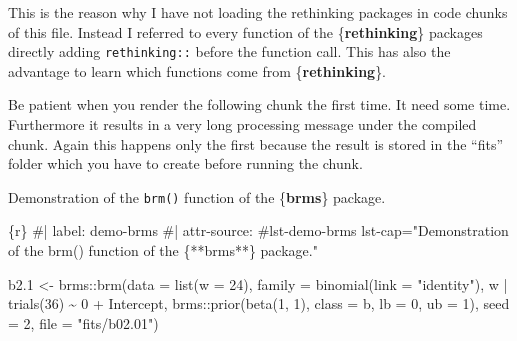 \documentclass[
  letterpaper,
  DIV=11,
  numbers=noendperiod]{scrreprt}
\newenvironment{Shaded}{\begin{snugshade}}{\end{snugshade}}
\newcommand{\AttributeTok}[1]{\textcolor[rgb]{0.40,0.45,0.13}{#1}}
\newcommand{\CommentTok}[1]{\textcolor[rgb]{0.37,0.37,0.37}{#1}}
\newcommand{\DecValTok}[1]{\textcolor[rgb]{0.68,0.00,0.00}{#1}}
\newcommand{\FloatTok}[1]{\textcolor[rgb]{0.68,0.00,0.00}{#1}}
\newcommand{\FunctionTok}[1]{\textcolor[rgb]{0.28,0.35,0.67}{#1}}
\newcommand{\InformationTok}[1]{\textcolor[rgb]{0.37,0.37,0.37}{#1}}
\newcommand{\NormalTok}[1]{\textcolor[rgb]{0.00,0.23,0.31}{#1}}
\newcommand{\OtherTok}[1]{\textcolor[rgb]{0.00,0.23,0.31}{#1}}
\newcommand{\SpecialCharTok}[1]{\textcolor[rgb]{0.37,0.37,0.37}{#1}}
\newcommand{\StringTok}[1]{\textcolor[rgb]{0.13,0.47,0.30}{#1}}
\begin{document}
This is the reason why I have not loading the rethinking packages in
code chunks of this file. Instead I referred to every function of the
\{\textbf{rethinking}\} packages directly adding \texttt{rethinking::}
before the function call. This has also the advantage to learn which
functions come from \{\textbf{rethinking}\}.

\begin{tcolorbox}[enhanced jigsaw, colframe=quarto-callout-warning-color-frame, colback=white, toprule=.15mm, breakable, arc=.35mm, bottomtitle=1mm, colbacktitle=quarto-callout-warning-color!10!white, toptitle=1mm, titlerule=0mm, title=\textcolor{quarto-callout-warning-color}{\faExclamationTriangle}\hspace{0.5em}{First compiling}, leftrule=.75mm, opacityback=0, rightrule=.15mm, opacitybacktitle=0.6, bottomrule=.15mm, left=2mm, coltitle=black]

Be patient when you render the following chunk the first time. It need
some time. Furthermore it results in a very long processing message
under the compiled chunk. Again this happens only the first because the
result is stored in the ``fits'' folder which you have to create before
running the chunk.

\end{tcolorbox}

\begin{codelisting}

\caption{Demonstration of the \texttt{brm()} function of the
\{\textbf{brms}\} package.}

\hypertarget{lst-demo-brms}{%
\label{lst-demo-brms}}%
\begin{Shaded}
\begin{Highlighting}[]
\InformationTok{\textasciigrave{}\textasciigrave{}\textasciigrave{}\{r\}}
\CommentTok{\#| label: demo{-}brms}
\CommentTok{\#| attr{-}source: \textquotesingle{}\#lst{-}demo{-}brms lst{-}cap="Demonstration of the \textasciigrave{}brm()\textasciigrave{} function of the \{**brms**\} package."\textquotesingle{}}

\NormalTok{b2}\FloatTok{.1} \OtherTok{\textless{}{-}}
\NormalTok{  brms}\SpecialCharTok{::}\FunctionTok{brm}\NormalTok{(}\AttributeTok{data =} \FunctionTok{list}\NormalTok{(}\AttributeTok{w =} \DecValTok{24}\NormalTok{), }
      \AttributeTok{family =} \FunctionTok{binomial}\NormalTok{(}\AttributeTok{link =} \StringTok{"identity"}\NormalTok{),}
\NormalTok{      w }\SpecialCharTok{|} \FunctionTok{trials}\NormalTok{(}\DecValTok{36}\NormalTok{) }\SpecialCharTok{\textasciitilde{}} \DecValTok{0} \SpecialCharTok{+}\NormalTok{ Intercept,}
\NormalTok{      brms}\SpecialCharTok{::}\FunctionTok{prior}\NormalTok{(}\FunctionTok{beta}\NormalTok{(}\DecValTok{1}\NormalTok{, }\DecValTok{1}\NormalTok{), }\AttributeTok{class =}\NormalTok{ b, }\AttributeTok{lb =} \DecValTok{0}\NormalTok{, }\AttributeTok{ub =} \DecValTok{1}\NormalTok{),}
      \AttributeTok{seed =} \DecValTok{2}\NormalTok{,}
      \AttributeTok{file =} \StringTok{"fits/b02.01"}\NormalTok{)}
\InformationTok{\textasciigrave{}\textasciigrave{}\textasciigrave{}}
\end{Highlighting}
\end{Shaded}

\end{codelisting}
\end{document}
